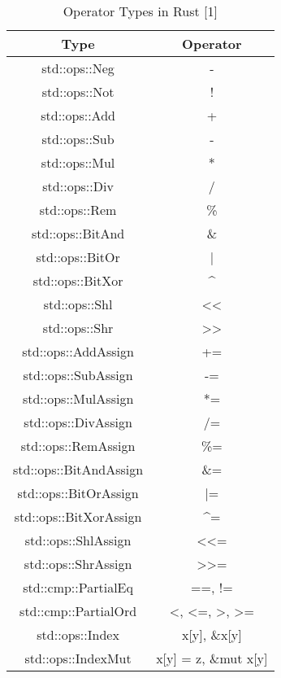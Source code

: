 \documentclass[sigconf,authorversion,nonacm]{acmart}
\begin{document}
\begin{table} [H]
\caption{Operator Types in Rust [1]}
    \begin{tabular}{ |c|c| }
    \hline
    Type & Operator \\
    \hline
    std::ops::Neg & - \\
    \hline
    std::ops::Not & ! \\
    \hline
    std::ops::Add & + \\
    \hline
    std::ops::Sub & - \\
    \hline
    std::ops::Mul & * \\
    \hline
    std::ops::Div & / \\
    \hline
    std::ops::Rem & \% \\
    \hline
    std::ops::BitAnd & \& \\
    \hline
    std::ops::BitOr & | \\
    \hline
    std::ops::BitXor & \^{}\\
    \hline
    std::ops::Shl & << \\
    \hline
    std::ops::Shr & >> \\
    \hline
    std::ops::AddAssign & += \\
    \hline
    std::ops::SubAssign & -= \\
    \hline
    std::ops::MulAssign & *= \\
    \hline
    std::ops::DivAssign & /= \\
    \hline
    std::ops::RemAssign & \%= \\
    \hline
    std::ops::BitAndAssign & \&= \\
    \hline
    std::ops::BitOrAssign & |= \\
    \hline
    std::ops::BitXorAssign & \^{}= \\
    \hline
    std::ops::ShlAssign & <<= \\
    \hline
    std::ops::ShrAssign & >>= \\
    \hline
    std::cmp::PartialEq & ==, != \\
    \hline
    std::cmp::PartialOrd & <, <=, >, >= \\
    \hline
    std::ops::Index & x[y], \&x[y] \\
    \hline
    std::ops::IndexMut &  x[y] = z,  \&mut x[y] \\
    \hline
    \end{tabular}
\end{table}
\end{document}

